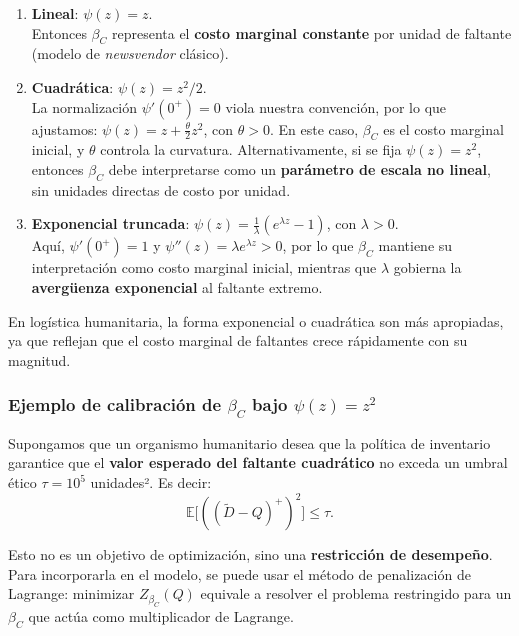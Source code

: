 \documentclass[
  spanish,
  us-letterpaper,
  DIV=11,
  numbers=noendperiod]{scrreprt}
\numberwithin{equation}{section}
\begin{document}
\begin{enumerate}
\def\labelenumi{\arabic{enumi}.}
\item
  \textbf{Lineal}: \(\psi(z) = z\).\\
  Entonces \(\beta_C\) representa el \textbf{costo marginal constante}
  por unidad de faltante (modelo de \emph{newsvendor} clásico).
\item
  \textbf{Cuadrática}: \(\psi(z) = z^2 / 2\).\\
  La normalización \(\psi'(0^+) = 0\) viola nuestra convención, por lo
  que ajustamos: \(\psi(z) = z + \frac{\theta}{2} z^2\), con
  \(\theta > 0\). En este caso, \(\beta_C\) es el costo marginal
  inicial, y \(\theta\) controla la curvatura. Alternativamente, si se
  fija \(\psi(z) = z^2\), entonces \(\beta_C\) debe interpretarse como
  un \textbf{parámetro de escala no lineal}, sin unidades directas de
  costo por unidad.
\item
  \textbf{Exponencial truncada}:
  \(\psi(z) = \frac{1}{\lambda}(e^{\lambda z} - 1)\), con
  \(\lambda > 0\).\\
  Aquí, \(\psi'(0^+) = 1\) y \(\psi''(z) = \lambda e^{\lambda z} > 0\),
  por lo que \(\beta_C\) mantiene su interpretación como costo marginal
  inicial, mientras que \(\lambda\) gobierna la \textbf{avergüenza
  exponencial} al faltante extremo.
\end{enumerate}

En logística humanitaria, la forma exponencial o cuadrática son más
apropiadas, ya que reflejan que el costo marginal de faltantes crece
rápidamente con su magnitud.

\subsubsection{\texorpdfstring{Ejemplo de calibración de \(\beta_C\)
bajo
\(\psi(z) = z^2\)}{Ejemplo de calibración de \textbackslash beta\_C bajo \textbackslash psi(z) = z\^{}2}}\label{ejemplo-de-calibraciuxf3n-de-beta_c-bajo-psiz-z2}

Supongamos que un organismo humanitario desea que la política de
inventario garantice que el \textbf{valor esperado del faltante
cuadrático} no exceda un umbral ético \(\tau = 10^5\) unidades². Es
decir: \[
\mathbb{E}\big[((\tilde{D} - Q)^+)^2\big] \leq \tau.
\]

Esto no es un objetivo de optimización, sino una \textbf{restricción de
desempeño}. Para incorporarla en el modelo, se puede usar el método de
penalización de Lagrange: minimizar \(Z_{\beta_C}(Q)\) equivale a
resolver el problema restringido para un \(\beta_C\) que actúa como
multiplicador de Lagrange.
\end{document}
